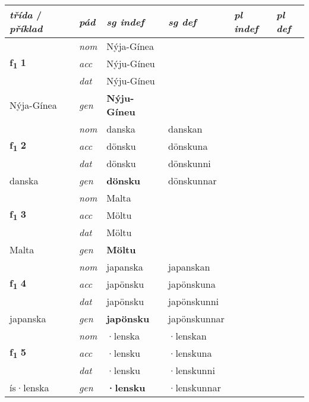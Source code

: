 \begin{longtable}[l]{X>{\footnotesize\itshape}XXXXX}
{\textbf{\textit{třída}} / \textit{příklad}} & {\textit{pád}} & {\textit{sg indef}} & {\textit{sg def}} & {\textit{pl indef}} & {\textit{pl def}}\\ \cmidrule{1-6}
\endhead
\multirow{3}{*}{{{\textbf{f{\textsubscript{1}}} \Large{\textbf{1}}}}} & nom & Nýja-Gínea &  & \textbf{} &  \\*
 & acc & Nýju-Gíneu &  &  &  \\*
 & dat & Nýju-Gíneu &  &  &  \\*
 {\footnotesize{Nýja-Gínea}} & gen & \textbf{Nýju-Gíneu} &  &  &  \\
\cmidrule{1-6}

\multirow{3}{*}{{{\textbf{f{\textsubscript{1}}} \Large{\textbf{2}}}}} & nom & danska & danskan & \textbf{} &  \\*
 & acc & dönsku & dönskuna &  &  \\*
 & dat & dönsku & dönskunni &  &  \\*
 {\footnotesize{danska}} & gen & \textbf{dönsku} & dönskunnar &  &  \\
\cmidrule{1-6}

\multirow{3}{*}{{{\textbf{f{\textsubscript{1}}} \Large{\textbf{3}}}}} & nom & Malta &  & \textbf{} &  \\*
 & acc & Möltu &  &  &  \\*
 & dat & Möltu &  &  &  \\*
 {\footnotesize{Malta}} & gen & \textbf{Möltu} &  &  &  \\
\cmidrule{1-6}

\multirow{3}{*}{{{\textbf{f{\textsubscript{1}}} \Large{\textbf{4}}}}} & nom & japanska & japanskan & \textbf{} &  \\*
 & acc & japönsku & japönskuna &  &  \\*
 & dat & japönsku & japönskunni &  &  \\*
 {\footnotesize{japanska}} & gen & \textbf{japönsku} & japönskunnar &  &  \\
\cmidrule{1-6}

\multirow{3}{*}{{{\textbf{f{\textsubscript{1}}} \Large{\textbf{5}}}}} & nom & ·lenska & ·lenskan & \textbf{} &  \\*
 & acc & ·lensku & ·lenskuna &  &  \\*
 & dat & ·lensku & ·lenskunni &  &  \\*
 {\footnotesize{ís\allowbreak ·lenska}} & gen & \textbf{·lensku} & ·lenskunnar &  &  \\
\cmidrule{1-6}


\end{longtable}
